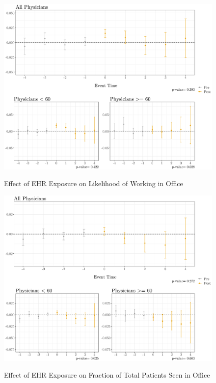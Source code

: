 \documentclass[11pt]{article}
\begin{document}
\begin{figure}[p]
    \centering
    \caption{Effect of EHR Exposure on Likelihood of Working in Office}
    \includegraphics[scale=.4]{Objects/officeind_plot.pdf}
    \label{fig:officefirst}
\end{figure}

\begin{figure}[p]
    \centering
    \caption{Effect of EHR Exposure on Fraction of Total Patients Seen in Office}
    \includegraphics[scale=.4]{Objects/officefrac_plot.pdf}
    \label{fig:officesecond}
\end{figure}
\end{document}
